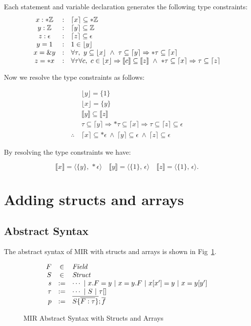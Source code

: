 \documentclass[peerreview, 10pt]{IEEEtran}
\newcommand{\Z}{\ensuremath{\mathbb{Z}}}
\newcommand{\cons}[1]{\ensuremath{\llbracket#1\rrbracket}}
\newcommand{\consp}[2]{\ensuremath{\langle#1,\,#2\rangle}}
\newcommand{\floor}[1]{\ensuremath{\lfloor#1\rfloor}}
\newcommand{\ceil}[1]{\ensuremath{\lceil#1\rceil}}
\newcommand{\enum}{\ensuremath{\epsilon}}
\newcommand{\ifrule}[2]{\ensuremath{#1&:&#2}}
\begin{document}
Each statement and variable declaration generates the following type constraints:
\[
\begin{array}{@{}ccl@{}}
  \ifrule{x:*\Z}{\ceil{x}\subseteq *\Z}\\
  \ifrule{y:\Z}{\ceil{y}\subseteq \Z}\\
  \ifrule{z:\enum}{\ceil{z}\subseteq \enum}\\
  \ifrule{y=1}{1\in\floor{y}}\\
  \ifrule{x=\&y}{\forall\tau,\ y\subseteq \floor{x}\ \land\ \tau\subseteq\ceil{y}\Rightarrow*\tau\subseteq\ceil{x}}\\
  \ifrule{z=*x}{\forall\tau\forall c,\ c\in \floor{x}\Rightarrow\cons{c}\subseteq\cons{z}\ \land\ *\tau\subseteq\ceil{x}\Rightarrow\tau\subseteq\ceil{z}}
\end{array}
\]

Now we resolve the type constraints as follows:

\[
\begin{aligned}
  &\floor{y}=\{1\}\\
  &\floor{x}=\{y\}\\
  &\cons{y}\subseteq\cons{z}\\
  &\tau\subseteq\ceil{y}\Rightarrow *\tau\subseteq\ceil{x}\Rightarrow\tau\subseteq\ceil{z}\subseteq\enum\\
  \therefore\ &\ceil{x}\subseteq*\enum\ \land\ \ceil{y}\subseteq\enum\ \land\ \ceil{z}\subseteq\enum
\end{aligned}
\]

By resolving the type constraints we have:

\[
\cons{x}=\consp{\{y\}}{*\enum}\quad\cons{y}=\consp{\{1\}}{\enum}\quad\cons{z}=\consp{\{1\}}{\enum}.
\]

\section{Adding structs and arrays}

\subsection{Abstract Syntax}
The abstract syntax of MIR with structs and arrays is shown in Fig~\ref{fig:mir-structs-arrays-absyn}.
\begin{figure}[ht]
\centering
\begin{framed}
\[
  \begin{array}{@{}rcl@{}}
    F &\in& \mathit{Field} \\
    S &\in& \mathit{Struct} \\
    s &:=& \cdots\ |\ x.F=y\ |\ x=y.F\ |\ x[x']=y\ |\ x=y[y'] \\
    \tau &:=& \cdots\ |\ S\ |\ \tau[] \\
    p &:=& \overline{S \{ \overline{F:\tau} \}}; \overline{f} \\
  \end{array}
\]
\end{framed}
\caption{MIR Abstract Syntax with Structs and Arrays}
\label{fig:mir-structs-arrays-absyn}
\end{figure}
\end{document}
